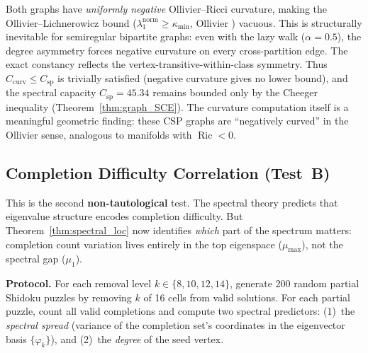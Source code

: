 \documentclass[11pt]{article}
\theoremstyle{definition}
\theoremstyle{remark}
\newcommand{\Ric}{\operatorname{Ric}}
\newcommand{\Csp}{C_{\mathrm{sp}}}
\begin{document}
Both graphs have \emph{uniformly negative} Ollivier--Ricci curvature, making the Ollivier--Lichnerowicz bound ($\lambda_1^{\mathrm{norm}} \ge \kappa_{\min}$, Ollivier \cite{Ollivier}) vacuous.  This is structurally inevitable for semiregular bipartite graphs: even with the lazy walk ($\alpha = 0.5$), the degree asymmetry forces negative curvature on every cross-partition edge.  The exact constancy reflects the vertex-transitive-within-class symmetry.  Thus $C_{\mathrm{curv}} \le \Csp$ is trivially satisfied (negative curvature gives no lower bound), and the spectral capacity $\Csp = 45.34$ remains bounded only by the Cheeger inequality (Theorem~\ref{thm:graph_SCE}).  The curvature computation itself is a meaningful geometric finding: these CSP graphs are ``negatively curved'' in the Ollivier sense, analogous to manifolds with $\Ric < 0$.


\subsection{Completion Difficulty Correlation (Test~B)}

This is the second \textbf{non-tautological} test. The spectral theory predicts that eigenvalue structure encodes completion difficulty. But Theorem~\ref{thm:spectral_loc} now identifies \emph{which} part of the spectrum matters: completion count variation lives entirely in the top eigenspace ($\mu_{\max}$), not the spectral gap ($\mu_1$).

\textbf{Protocol.} For each removal level $k \in \{8, 10, 12, 14\}$, generate 200 random partial Shidoku puzzles by removing $k$ of 16 cells from valid solutions. For each partial puzzle, count all valid completions and compute two spectral predictors: (1)~the \emph{spectral spread} (variance of the completion set's coordinates in the eigenvector basis $\{\varphi_k\}$), and (2)~the \emph{degree} of the seed vertex.
\end{document}
